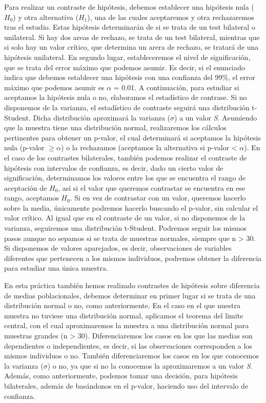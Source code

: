 \documentclass[
]{article}
\begin{document}
Para realizar un contraste de hipótesis, debemos establecer una
hipótesis nula (\(H_{0}\)) y otra alternativa (\(H_{1}\)), una de las
cuales aceptaremos y otra rechazaremos tras el estudio. Estas hipótesis
determinarán de si se trata de un test bilateral o unilateral. Si hay
dos areas de rechazo, se trata de un test bilateral, mientras que si
solo hay un valor crítico, que determina un arera de rechazo, se tratará
de una hipótesis unilateral. En segundo lugar, estableceremos el nivel
de significación, que se trata del error máximo que podemos asumir. Es
decir, si el enunciado indica que debemos establecer una hipótesis con
una confianza del 99\%, el error máximo que podemos asumir es \(\alpha\)
= 0.01. A continuación, para estudiar si aceptamos la hipótesis nula o
no, elaboramos el estadístico de contrase. Si no disponemos de la
varianza, el estadístico de contraste seguirá una distribución
t-Student. Dicha distribución aproximará la varianza (\(\sigma\)) a un
valor \emph{S}. Asumiendo que la muestra tiene una distribución normal,
realizaremos los cálculos pertinentes para obtener un p-valor, el cual
determinará si aceptamos la hipótesis nula (p-valor \(\ge \alpha\)) o la
rechazamos (aceptamos la alternativa si p-valor \textless{} \(\alpha\)).
En el caso de los contrastes bilaterales, también podemos realizar el
contraste de hipótesis con intervalos de confianza, es decir, dado un
cierto valor de significación, determinamos los valores entre los que se
encuentra el rango de aceptación de \(H_{0}\), así si el valor que
queremos contrastar se encuentra en ese rango, aceptamos \(H_{0}\). Si
en vez de contrastar con un valor, queremos hacerlo sobre la media,
únicamente podremos hacerlo buscando el p-valor, sin calcular el valor
crítico. Al igual que en el contraste de un valor, si no disponemos de
la varianza, seguiremos una distribución t-Student. Podremos seguir los
mismos pasos aunque no sepamos si se trata de muestras normales, siempre
que n \textgreater{} 30. Si disponemos de valores aparejados, es decir,
observaciones de variables diferentes que pertenecen a los mismos
individuos, podremos obtener la diferencia para estudiar una única
muestra.

En esta práctica también hemos realizado contrastes de hipótesis sobre
diferencia de medias poblacionales, debemos determinar en primer lugar
si se trata de una distribución normal o no, como anteriormente. En el
caso en el que nuestra muestra no tuviese una distribución normal,
aplicamos el teorema del limite central, con el cual aproximaremos la
muestra a una distribución normal para muestras grandes (n
\textgreater{} 30). Diferenciaremos los casos en los que las medias son
dependientes o independientes, es decir, si las observaciones
corresponden a los mismos individuos o no. También diferenciaremos los
casos en los que conocemos la varianza (\(\sigma\)) o no, ya que si no
la conocemos la aproximaremos a un valor \emph{S}. Además, como
anteriormente, podemos tomar una decisión, para hipótesis bilaterales,
además de basándonos en el p-valor, haciendo uso del intervalo de
confianza.
\end{document}
